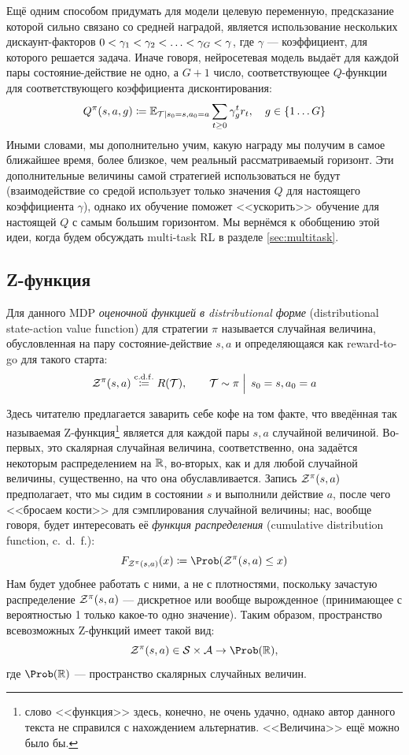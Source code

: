 \begin{remark}
Ещё одним способом придумать для модели целевую переменную, предсказание которой сильно связано со средней наградой, является использование нескольких дискаунт-факторов $0 \HM< \gamma_1 \HM< \gamma_2 \HM< \dots \HM< \gamma_G \HM< \gamma$, где $\gamma$ --- коэффициент, для которого решается задача. Иначе говоря, нейросетевая модель выдаёт для каждой пары состояние-действие не одно, а $G+1$ число, соответствующее $Q$-функции для соответствующего коэффициента дисконтирования:
$$Q^\pi(s, a, g) \coloneqq \mathbb{E}_{\mathcal{T} \mid s_0 = s, a_0 = a} \sum_{t \ge 0} \gamma_g^t r_t, \quad g \in \{1 \dots G \}$$
Иными словами, мы дополнительно учим, какую награду мы получим в самое ближайшее время, более близкое, чем реальный рассматриваемый горизонт. Эти дополнительные величины самой стратегией использоваться не будут (взаимодействие со средой использует только значения $Q$ для настоящего коэффициента $\gamma$), однако их обучение поможет <<ускорить>> обучение для настоящей $Q$ с самым большим горизонтом. Мы вернёмся к обобщению этой идеи, когда будем обсуждать multi-task RL в разделе \ref{sec:multitask}.
\end{remark}

\subsection{Z-функция}

\begin{definition} 
Для данного MDP \emph{оценочной функцией в distributional форме} (distributional state-action value function) для стратегии $\pi$ называется случайная величина, обусловленная на пару состояние-действие $s, a$ и определяющаяся как reward-to-go для такого старта:
$$\mathcal{Z}^\pi(s, a) \mathrel{\stackrel{\mathrm{c.d.f.}}\coloneqq} R(\mathcal{T}), \qquad \mathcal{T} \sim \pi \mathrel{\Big|} \, s_0 = s, a_0 = a $$
\end{definition}

Здесь читателю предлагается заварить себе кофе на том факте, что введённая так называемая Z-функция\footnote{слово <<функция>> здесь, конечно, не очень удачно, однако автор данного текста не справился с нахождением альтернатив. <<Величина>> ещё можно было бы.} является для каждой пары $s, a$ случайной величиной. Во-первых, это скалярная случайная величина, соответственно, она задаётся некоторым распределением на $\mathbb{R}$, во-вторых, как и для любой случайной величины, существенно, на что она обуславливается. Запись $\mathcal{Z}^\pi(s, a)$ предполагает, что мы сидим в состоянии $s$ и выполнили действие $a$, после чего <<бросаем кости>> для сэмплирования случайной величины; нас, вообще говоря, будет интересовать её \emph{функция распределения} (cumulative distribution function, c.~d.~f.):
$$F_{\Z^\pi(s, a)}(x) \coloneqq \Prob (\Z^\pi(s, a) \le x)$$
Нам будет удобнее работать с ними, а не с плотностями, поскольку зачастую распределение $\mathcal{Z}^\pi(s, a)$ --- дискретное или вообще вырожденное (принимающее с вероятностью 1 только какое-то одно значение). Таким образом, пространство всевозможных Z-функций имеет такой вид:
\begin{equation}\label{Zfunctionspace}
\Z^\pi(s, a) \in \St \times \A \to \Prob (\R),
\end{equation}
где $\Prob (\R)$ --- пространство скалярных случайных величин. 

